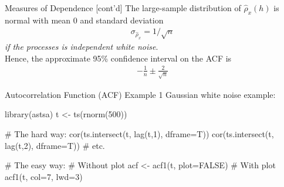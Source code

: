 \documentclass[ignorenonframetext,xcolor=x11names]{beamer}
\begin{document}
\begin{frame}{Measures of Dependence \small [cont'd]}
The large-sample distribution of $\hat{\rho}_{x}(h)$ is normal with mean $0$ and standard deviation
\begin{align*}
\sigma_{\hat{\rho}_{x}} = 1/ \sqrt{n} 
\end{align*}
\emph{if the processes is independent white noise}. \\

Hence, the approximate 95\% confidence interval on the ACF is
\begin{align*}
-\frac{1}{n} \pm \frac{2}{\sqrt{n}}
\end{align*}
\end{frame}




\begin{frame}[fragile]{Autocorrelation Function (ACF) Example 1}
Gaussian white noise example:
\begin{Rcode}
library(astsa)
t <- ts(rnorm(500))

# The hard way:
cor(ts.intersect(t, lag(t,1), dframe=T))
cor(ts.intersect(t, lag(t,2), dframe=T))
# etc.

# The easy way:
# Without plot
acf <- acf1(t, plot=FALSE)
# With plot
acf1(t, col=7, lwd=3)
\end{Rcode}
\end{frame}
\end{document}
